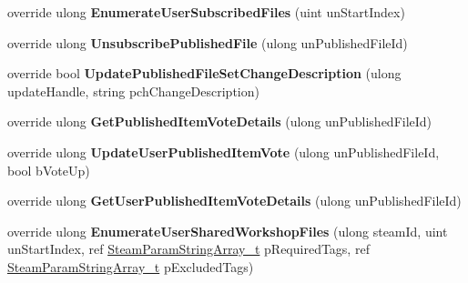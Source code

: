\begin{DoxyCompactItemize}
\item 
\hypertarget{classValve_1_1Steamworks_1_1CSteamRemoteStorage_a7f1a53140a28e1493b414ae2287bec71}{}override ulong {\bfseries Enumerate\+User\+Subscribed\+Files} (uint un\+Start\+Index)\label{classValve_1_1Steamworks_1_1CSteamRemoteStorage_a7f1a53140a28e1493b414ae2287bec71}

\item 
\hypertarget{classValve_1_1Steamworks_1_1CSteamRemoteStorage_a8b8ec8f887dea8652bda0958d63f7b6f}{}override ulong {\bfseries Unsubscribe\+Published\+File} (ulong un\+Published\+File\+Id)\label{classValve_1_1Steamworks_1_1CSteamRemoteStorage_a8b8ec8f887dea8652bda0958d63f7b6f}

\item 
\hypertarget{classValve_1_1Steamworks_1_1CSteamRemoteStorage_ae4bd629c5a870e4a826bdb9862b59912}{}override bool {\bfseries Update\+Published\+File\+Set\+Change\+Description} (ulong update\+Handle, string pch\+Change\+Description)\label{classValve_1_1Steamworks_1_1CSteamRemoteStorage_ae4bd629c5a870e4a826bdb9862b59912}

\item 
\hypertarget{classValve_1_1Steamworks_1_1CSteamRemoteStorage_a47eccf40a25766a33c34001400cb8da9}{}override ulong {\bfseries Get\+Published\+Item\+Vote\+Details} (ulong un\+Published\+File\+Id)\label{classValve_1_1Steamworks_1_1CSteamRemoteStorage_a47eccf40a25766a33c34001400cb8da9}

\item 
\hypertarget{classValve_1_1Steamworks_1_1CSteamRemoteStorage_a9cd3cfc5d5baf197f088e3c973480b39}{}override ulong {\bfseries Update\+User\+Published\+Item\+Vote} (ulong un\+Published\+File\+Id, bool b\+Vote\+Up)\label{classValve_1_1Steamworks_1_1CSteamRemoteStorage_a9cd3cfc5d5baf197f088e3c973480b39}

\item 
\hypertarget{classValve_1_1Steamworks_1_1CSteamRemoteStorage_aa5ae9a3ca943db7ec46491ec7c98fdbd}{}override ulong {\bfseries Get\+User\+Published\+Item\+Vote\+Details} (ulong un\+Published\+File\+Id)\label{classValve_1_1Steamworks_1_1CSteamRemoteStorage_aa5ae9a3ca943db7ec46491ec7c98fdbd}

\item 
\hypertarget{classValve_1_1Steamworks_1_1CSteamRemoteStorage_ae01f2db61c13b68ab3d63d1aa7830f87}{}override ulong {\bfseries Enumerate\+User\+Shared\+Workshop\+Files} (ulong steam\+Id, uint un\+Start\+Index, ref \hyperlink{structValve_1_1Steamworks_1_1SteamParamStringArray__t}{Steam\+Param\+String\+Array\+\_\+t} p\+Required\+Tags, ref \hyperlink{structValve_1_1Steamworks_1_1SteamParamStringArray__t}{Steam\+Param\+String\+Array\+\_\+t} p\+Excluded\+Tags)\label{classValve_1_1Steamworks_1_1CSteamRemoteStorage_ae01f2db61c13b68ab3d63d1aa7830f87}


\end{DoxyCompactItemize}
